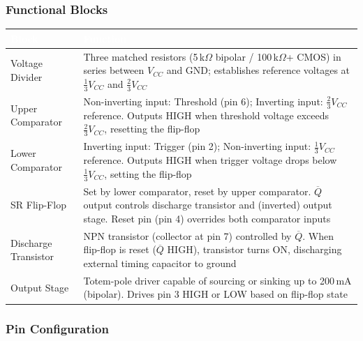 \documentclass[11pt,letterpaper]{article}
\newcommand{\tableheader}[1]{\textbf{\sffamily\textcolor{white}{#1}}}
\begin{document}
\subsubsection{Functional Blocks}

\begin{center}
\begin{tabularx}{\textwidth}{L{3.5cm}X}
\toprule
{}
\tableheader{Block} & \tableheader{Function} \\
\midrule
Voltage Divider & Three matched resistors (5\,k$\Omega$ bipolar / 100\,k$\Omega$+ CMOS) in series between $V_{CC}$ and GND; establishes reference voltages at $\frac{1}{3}V_{CC}$ and $\frac{2}{3}V_{CC}$ \\
Upper Comparator & Non-inverting input: Threshold (pin 6); Inverting input: $\frac{2}{3}V_{CC}$ reference. Outputs HIGH when threshold voltage exceeds $\frac{2}{3}V_{CC}$, resetting the flip-flop \\
Lower Comparator & Inverting input: Trigger (pin 2); Non-inverting input: $\frac{1}{3}V_{CC}$ reference. Outputs HIGH when trigger voltage drops below $\frac{1}{3}V_{CC}$, setting the flip-flop \\
SR Flip-Flop & Set by lower comparator, reset by upper comparator. $\overline{Q}$ output controls discharge transistor and (inverted) output stage. Reset pin (pin 4) overrides both comparator inputs \\
Discharge Transistor & NPN transistor (collector at pin 7) controlled by $\overline{Q}$. When flip-flop is reset ($\overline{Q}$ HIGH), transistor turns ON, discharging external timing capacitor to ground \\
Output Stage & Totem-pole driver capable of sourcing or sinking up to 200\,mA (bipolar). Drives pin 3 HIGH or LOW based on flip-flop state \\
\bottomrule
\end{tabularx}
\end{center}

\subsubsection{Pin Configuration}
\end{document}
